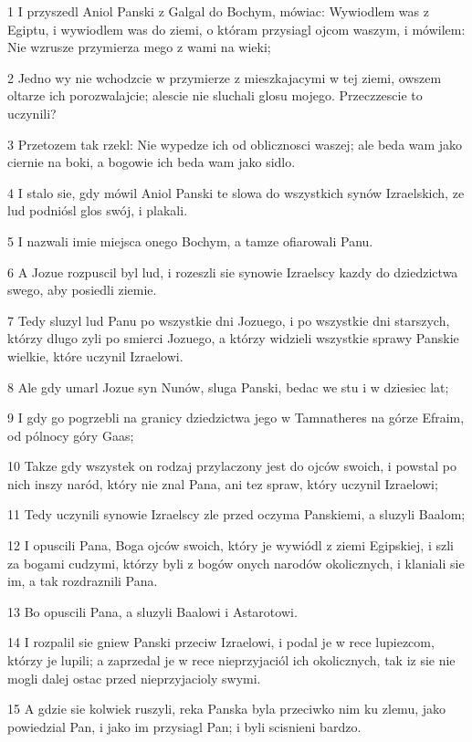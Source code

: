\par 1 I przyszedl Aniol Panski z Galgal do Bochym, mówiac: Wywiodlem was z Egiptu, i wywiodlem was do ziemi, o któram przysiagl ojcom waszym, i mówilem: Nie wzrusze przymierza mego z wami na wieki;
\par 2 Jedno wy nie wchodzcie w przymierze z mieszkajacymi w tej ziemi, owszem oltarze ich porozwalajcie; alescie nie sluchali glosu mojego. Przeczzescie to uczynili?
\par 3 Przetozem tak rzekl: Nie wypedze ich od oblicznosci waszej; ale beda wam jako ciernie na boki, a bogowie ich beda wam jako sidlo.
\par 4 I stalo sie, gdy mówil Aniol Panski te slowa do wszystkich synów Izraelskich, ze lud podniósl glos swój, i plakali.
\par 5 I nazwali imie miejsca onego Bochym, a tamze ofiarowali Panu.
\par 6 A Jozue rozpuscil byl lud, i rozeszli sie synowie Izraelscy kazdy do dziedzictwa swego, aby posiedli ziemie.
\par 7 Tedy sluzyl lud Panu po wszystkie dni Jozuego, i po wszystkie dni starszych, którzy dlugo zyli po smierci Jozuego, a którzy widzieli wszystkie sprawy Panskie wielkie, które uczynil Izraelowi.
\par 8 Ale gdy umarl Jozue syn Nunów, sluga Panski, bedac we stu i w dziesiec lat;
\par 9 I gdy go pogrzebli na granicy dziedzictwa jego w Tamnatheres na górze Efraim, od pólnocy góry Gaas;
\par 10 Takze gdy wszystek on rodzaj przylaczony jest do ojców swoich, i powstal po nich inszy naród, który nie znal Pana, ani tez spraw, który uczynil Izraelowi;
\par 11 Tedy uczynili synowie Izraelscy zle przed oczyma Panskiemi, a sluzyli Baalom;
\par 12 I opuscili Pana, Boga ojców swoich, który je wywiódl z ziemi Egipskiej, i szli za bogami cudzymi, którzy byli z bogów onych narodów okolicznych, i klaniali sie im, a tak rozdraznili Pana.
\par 13 Bo opuscili Pana, a sluzyli Baalowi i Astarotowi.
\par 14 I rozpalil sie gniew Panski przeciw Izraelowi, i podal je w rece lupiezcom, którzy je lupili; a zaprzedal je w rece nieprzyjaciól ich okolicznych, tak iz sie nie mogli dalej ostac przed nieprzyjacioly swymi.
\par 15 A gdzie sie kolwiek ruszyli, reka Panska byla przeciwko nim ku zlemu, jako powiedzial Pan, i jako im przysiagl Pan; i byli scisnieni bardzo.
